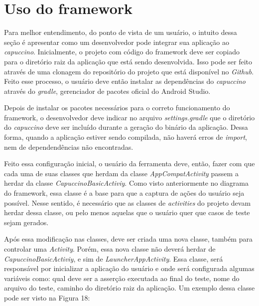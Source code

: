 \documentclass[
    12pt,       %
    openright,      %
    twoside,      %
    a4paper,      %
    english,      %
    french,       %
    spanish,      %
    brazil,       %
    ]{abntex2}
\begin{document}
      \section{Uso do framework}
        Para melhor entendimento, do ponto de vista de um usuário, o intuito dessa seção é apresentar como um
        desenvolvedor pode integrar sua aplicação ao \textit{capuccino}. Inicialmente, o projeto com código
        do framework deve ser copiado para o diretório raiz da aplicação que está sendo desenvolvida. Isso pode
        ser feito através de uma clonagem do repositório do projeto que está disponível no \textit{Github}.
        Feito esse processo, o usuário deve então instalar as dependências do \textit{capuccino} através do
        \textit{gradle}, gerenciador de pacotes oficial do Android Studio.

        Depois de instalar os pacotes necessários para o correto funcionamento do framework, o desenvolvedor
        deve indicar no arquivo \textit{settings.gradle} que o diretório do \textit{capuccino} deve ser
        incluído durante a geração do binário da aplicação. Dessa forma, quando a aplicação estiver sendo
        compilada, não haverá erros de \textit{import}, nem de dependendências não encontradas.

        Feito essa configuração inicial, o usuário da ferramenta deve, então, fazer com que cada uma de suas
        classes que herdam da classe \textit{AppCompatActivity} passem a herdar da classe
        \textit{CapuccinoBasicActiviy}. Como visto anteriormente no diagrama do framework, essa classe é
        a base para que a captura de ações do usuário seja possível. Nesse sentido, é necessário que as
        classes de \textit{activities} do projeto devam herdar dessa classe, ou pelo menos aquelas que o
        usuário quer que casos de teste sejam gerados.

        Após essa modificação nas classes, deve ser criada uma nova classe, também para controlar uma
        \textit{Activity}. Porém, essa nova classe não deverá herdar de \textit{CapuccinoBasicActiviy},
        e sim de \textit{LauncherAppActivity}. Essa classe, será responsável por inicializar a aplicação
        do usuário e onde será configurada algumas variáveis como: qual deve ser a asserção executada ao
        final do teste, nome do arquivo do teste, caminho do diretório raiz da aplicação. Um exemplo
        dessa classe pode ser visto na Figura 18:
\end{document}

